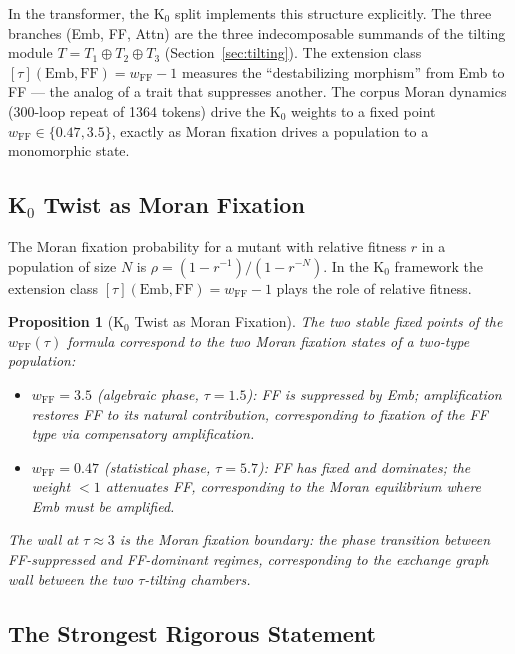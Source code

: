 \documentclass[11pt]{amsart}
\newtheorem{proposition}[theorem]{Proposition}
\begin{document}
In the transformer, the K$_0$ split implements this structure
explicitly.
The three branches (Emb, FF, Attn) are the three indecomposable
summands of the tilting module $T = T_1 \oplus T_2 \oplus T_3$
(Section~\ref{sec:tilting}).
The extension class $[\tau](\mathrm{Emb}, \mathrm{FF}) = w_\mathrm{FF} - 1$
measures the ``destabilizing morphism'' from Emb to FF --- the analog
of a trait that suppresses another.
The corpus Moran dynamics (300-loop repeat of 1364 tokens) drive the
K$_0$ weights to a fixed point $w_\mathrm{FF} \in \{0.47, 3.5\}$,
exactly as Moran fixation drives a population to a monomorphic state.

\subsection{K$_0$ Twist as Moran Fixation}
\label{sec:moran_fixation}

The Moran fixation probability for a mutant with relative fitness $r$
in a population of size $N$ is
$\rho = (1 - r^{-1})/(1 - r^{-N})$.
In the K$_0$ framework the extension class $[\tau](\mathrm{Emb},
\mathrm{FF}) = w_\mathrm{FF} - 1$ plays the role of relative fitness.

\begin{proposition}[K$_0$ Twist as Moran Fixation]
\label{prop:moran_fixation}
The two stable fixed points of the $w_\mathrm{FF}(\tau)$ formula
correspond to the two Moran fixation states of a two-type population:
\begin{itemize}
\item $w_\mathrm{FF} = 3.5$ (algebraic phase, $\tau = 1.5$):
  FF is suppressed by Emb; amplification restores FF to its natural
  contribution, corresponding to fixation of the FF type via
  compensatory amplification.
\item $w_\mathrm{FF} = 0.47$ (statistical phase, $\tau = 5.7$):
  FF has fixed and dominates; the weight $< 1$ attenuates FF,
  corresponding to the Moran equilibrium where Emb must be amplified.
\end{itemize}
The wall at $\tau \approx 3$ is the Moran fixation boundary: the
phase transition between FF-suppressed and FF-dominant regimes,
corresponding to the exchange graph wall between the two
$\tau$-tilting chambers.
\end{proposition}

\subsection{The Strongest Rigorous Statement}
\label{sec:moran_rigorous}
\end{document}

